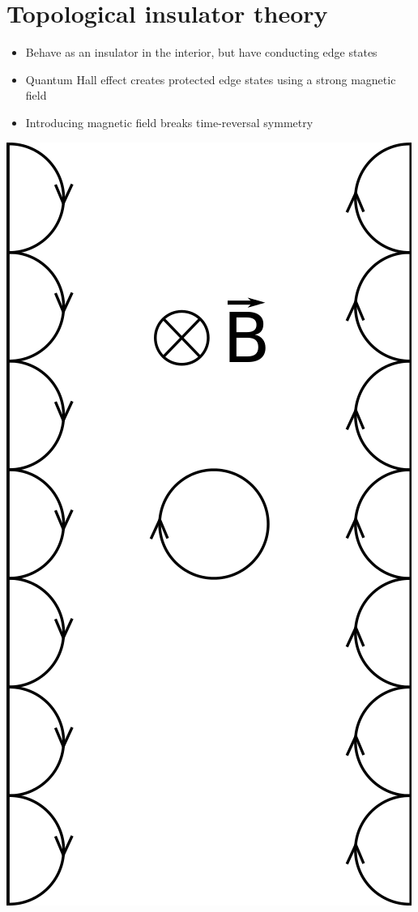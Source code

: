 \documentclass[12pt]{article}
\numberwithin{equation}{section}
\begin{document}
\section{Topological insulator theory}
\begin{minipage}[c]{0.45\textwidth}
  \begin{itemize}
    \item Behave as an insulator in the interior, but have conducting edge states
    \item Quantum Hall effect creates protected edge states using a strong magnetic field
    \item Introducing magnetic field breaks time-reversal symmetry
  \end{itemize}
\end{minipage}
\hfill
\begin{minipage}[c]{0.45\textwidth}
  \includegraphics[height=0.75\textheight]{./media/edge_channels_sketch.png}
\end{minipage}
\end{document}
